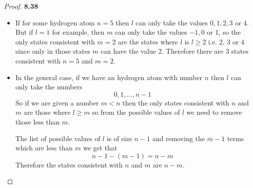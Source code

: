 \documentclass[11pt]{article}
\theoremstyle{definition}
\begin{document}
\cleardoublepage
\begin{proof}{\textbf{8.38}}
\begin{itemize}
\item [\textbf{(a)}] If for some hydrogen atom $n = 5$ then $l$ can only take
the values $0, 1, 2, 3$ or $4$. But if $l = 1$ for example, then $m$ can only
take the values $-1, 0$ or 1, so the only states consistent with $m = 2$ are
the states where $l$ is $l \geq 2$ i.e. 2, 3 or 4 since only in those states
$m$ can have the value 2. Therefore there are 3 states consistent with $n = 5$
and $m = 2$.
\item [\textbf{(b)}] In the general case, if we have an hydrogen atom with
number $n$ then $l$ can only take the numbers
$$0, 1, ..., n-1$$
So if we are given a number $m < n$ then the only states consistent with
$n$ and $m$ are those where $l \geq m$ so from the possible values of $l$
we need to remove those less than $m$.

The list of possible values of $l$ is of size $n -1$ and removing the $m -1$
terms which are less than $m$ we get that
$$n- 1 - (m -1) = n - m$$
Therefore the states consistent with $n$ and $m$ are $n - m$.
\end{itemize}
\end{proof}
\end{document}
